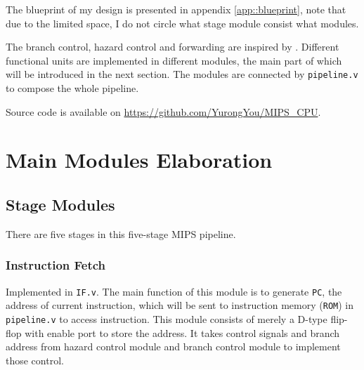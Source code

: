 \documentclass[paper=a4, fontsize=11pt]{scrartcl} %
\numberwithin{equation}{section} %
\numberwithin{figure}{section} %
\numberwithin{table}{section} %
\begin{document}
\begin{spacing}{1.5}
	The blueprint of my design is presented in appendix \ref{app::blueprint}, note that due to the limited space, I do not circle what stage module consist what modules.
	
	The branch control, hazard control and forwarding are inspired by \cite{COD}. Different functional units are implemented in different modules, the main part of which will be introduced in the next section. The modules are connected by \verb|pipeline.v| to compose the whole pipeline.
	
	Source code is available on \url{https://github.com/YurongYou/MIPS_CPU}.
	
\section{Main Modules Elaboration}
    \subsection{Stage Modules}
    	There are five stages in this five-stage MIPS pipeline.
    	\subsubsection{Instruction Fetch} Implemented in \verb|IF.v|. The main function of this module is to generate \verb|PC|, the address of current instruction, which will be sent to instruction memory (\verb|ROM|) in \verb|pipeline.v| to access instruction. This module consists of merely a D-type flip-flop with enable port to store the address. It takes control signals and branch address from hazard control module and branch control module to implement those control.

\end{spacing}
\end{document}
